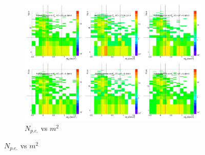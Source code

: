 \begin{figure}[H]
  \centering
    \begin{subfigure}{1\textwidth}
    \includegraphics[width=1\textwidth]{hiptfits/neg/PSaccthreshold_cent0_ich0_accfire0_ptbin13.jpg}
    \caption{$N_{p.e.}$ vs $m^2$}
    \end{subfigure}
\end{figure}

